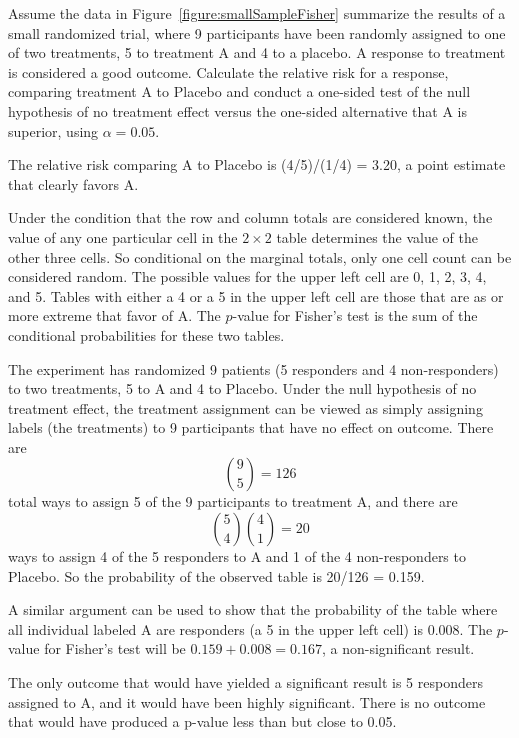 \begin{examplewrap}
  \begin{nexample}{Assume the data in Figure~\ref{figure:smallSampleFisher} summarize the results of a small randomized trial, where 9 participants have been randomly assigned to one of two treatments, 5 to treatment A and 4 to a placebo. A response to treatment is considered a good outcome.  Calculate the relative risk for a response, comparing treatment A to Placebo and conduct a one-sided test of the null hypothesis of no treatment effect versus the one-sided alternative that A is superior, using $\alpha = 0.05$.}\label{ex:fisherTestSmallSample} 

    The relative risk comparing A to Placebo is (4/5)/(1/4) = 3.20, a point estimate that clearly favors A. 

    Under the condition that the row and column totals are considered known, the value of any one particular cell in the $2 \times 2$ table determines the value of the other three cells.  So conditional on the marginal totals, only one cell count can be considered random. The possible values for the upper left cell are 0, 1, 2, 3, 4, and 5.  Tables with either a 4 or a 5 in the upper left cell are those that are as or more extreme that favor of A.  The $p$-value for Fisher's test is the sum of the conditional probabilities for these two tables.

    The experiment has randomized 9 patients (5 responders and 4 non-responders) to two treatments, 5 to A and 4 to Placebo.  Under the null hypothesis of no treatment effect, the treatment assignment can be viewed as simply assigning labels (the treatments) to 9 participants that have no effect on outcome.   There are 
\[
  \binom{9}{5} = 126
\]
total ways to assign 5 of the 9 participants to treatment A, and there are 
    \[
      \binom{5}{4} \binom{4}{1} = 20
    \]
ways to assign 4 of the 5 responders to A  and 1 of the 4 non-responders to Placebo.  So the probability of the observed table is 20/126 = 0.159.

A similar argument can be used to show that the probability of the table where all individual labeled A are responders (a 5 in the upper left cell) is 0.008.  The $p$-value for Fisher's test will be $0.159 + 0.008 = 0.167$, a non-significant result.  

The only outcome that would have yielded a significant result is 5 responders assigned to A, and it would have been highly significant. There is no outcome that would have produced a p-value less than but close to 0.05.
  \end{nexample}
\end{examplewrap}


